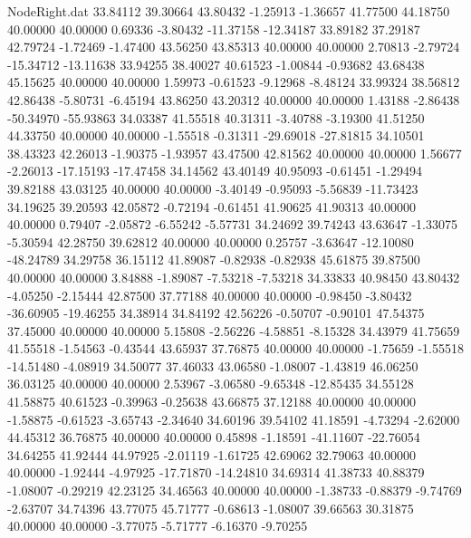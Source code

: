 \begin{filecontents}{NodeRight.dat}
  33.84112   39.30664   43.80432    -1.25913   -1.36657   41.77500   44.18750   40.00000   40.00000    0.69336   -3.80432  -11.37158  -12.34187
  33.89182   37.29187   42.79724    -1.72469   -1.47400   43.56250   43.85313   40.00000   40.00000    2.70813   -2.79724  -15.34712  -13.11638
  33.94255   38.40027   40.61523    -1.00844   -0.93682   43.68438   45.15625   40.00000   40.00000    1.59973   -0.61523   -9.12968   -8.48124
  33.99324   38.56812   42.86438    -5.80731   -6.45194   43.86250   43.20312   40.00000   40.00000    1.43188   -2.86438  -50.34970  -55.93863
  34.03387   41.55518   40.31311    -3.40788   -3.19300   41.51250   44.33750   40.00000   40.00000   -1.55518   -0.31311  -29.69018  -27.81815
  34.10501   38.43323   42.26013    -1.90375   -1.93957   43.47500   42.81562   40.00000   40.00000    1.56677   -2.26013  -17.15193  -17.47458
  34.14562   43.40149   40.95093    -0.61451   -1.29494   39.82188   43.03125   40.00000   40.00000   -3.40149   -0.95093   -5.56839  -11.73423
  34.19625   39.20593   42.05872    -0.72194   -0.61451   41.90625   41.90313   40.00000   40.00000    0.79407   -2.05872   -6.55242   -5.57731
  34.24692   39.74243   43.63647    -1.33075   -5.30594   42.28750   39.62812   40.00000   40.00000    0.25757   -3.63647  -12.10080  -48.24789
  34.29758   36.15112   41.89087    -0.82938   -0.82938   45.61875   39.87500   40.00000   40.00000    3.84888   -1.89087   -7.53218   -7.53218
  34.33833   40.98450   43.80432    -4.05250   -2.15444   42.87500   37.77188   40.00000   40.00000   -0.98450   -3.80432  -36.60905  -19.46255
  34.38914   34.84192   42.56226    -0.50707   -0.90101   47.54375   37.45000   40.00000   40.00000    5.15808   -2.56226   -4.58851   -8.15328
  34.43979   41.75659   41.55518    -1.54563   -0.43544   43.65937   37.76875   40.00000   40.00000   -1.75659   -1.55518  -14.51480   -4.08919
  34.50077   37.46033   43.06580    -1.08007   -1.43819   46.06250   36.03125   40.00000   40.00000    2.53967   -3.06580   -9.65348  -12.85435
  34.55128   41.58875   40.61523    -0.39963   -0.25638   43.66875   37.12188   40.00000   40.00000   -1.58875   -0.61523   -3.65743   -2.34640
  34.60196   39.54102   41.18591    -4.73294   -2.62000   44.45312   36.76875   40.00000   40.00000    0.45898   -1.18591  -41.11607  -22.76054
  34.64255   41.92444   44.97925    -2.01119   -1.61725   42.69062   32.79063   40.00000   40.00000   -1.92444   -4.97925  -17.71870  -14.24810
  34.69314   41.38733   40.88379    -1.08007   -0.29219   42.23125   34.46563   40.00000   40.00000   -1.38733   -0.88379   -9.74769   -2.63707
  34.74396   43.77075   45.71777    -0.68613   -1.08007   39.66563   30.31875   40.00000   40.00000   -3.77075   -5.71777   -6.16370   -9.70255

\end{filecontents}
